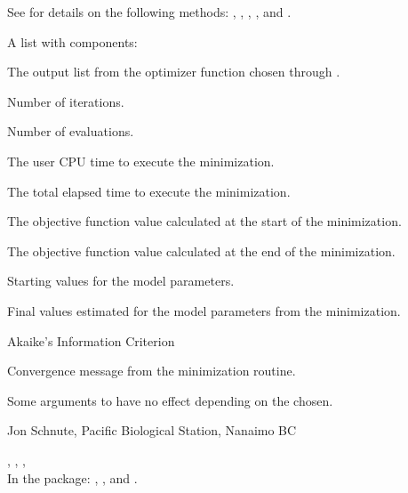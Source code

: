 \documentclass[letterpaper]{book}
\begin{document}
\begin{Details}\relax
See  for details on the following methods: ,
, , , and .
\end{Details}
\begin{Value}
A list with components:
\begin{ldescription}
\item[\code{Fout}] The output list from the optimizer function chosen through .
\item[\code{iters}] Number of iterations.
\item[\code{evals}] Number of evaluations.
\item[\code{cpuTime}] The user CPU time to execute the minimization.
\item[\code{elapTime}] The total elapsed time to execute the minimization.
\item[\code{fminS}] The objective function value calculated at the start of the minimization.
\item[\code{fminE}] The objective function value calculated at the end of the minimization.
\item[\code{Pstart}] Starting values for the model parameters.
\item[\code{Pend}] Final values estimated for the model parameters from the minimization.
\item[\code{AIC}] Akaike's Information Criterion
\item[\code{message}] Convergence message from the minimization routine.
\end{ldescription}
\end{Value}
\begin{Note}\relax
Some arguments to  have no effect depending on the  chosen.
\end{Note}
\begin{Author}\relax
Jon Schnute, Pacific Biological Station, Nanaimo BC
\end{Author}
\begin{SeeAlso}\relax
{}, , ,  \\
In the  package: , , and .
\end{SeeAlso}
\end{document}
